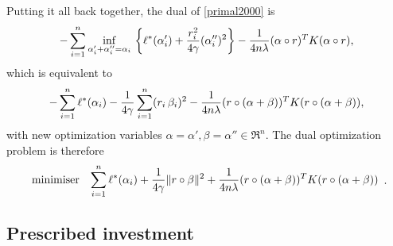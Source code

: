Putting it all back together, the dual of \eqref{primal2000} is
\begin{equation}
  -\sum_{i=1}^n \inf_{\alpha_i'+\alpha_i''=\alpha_i}\,\left\{\ell^*(\alpha_i') + \frac{r_i^2}{4\gamma}(\alpha_i'')^2\right\}  - \frac{1}{4n\lambda} (\alpha \circ r)^TK(\alpha \circ r),
\end{equation}
which is equivalent to
\begin{equation}
  -\sum_{i=1}^n \ell^*(\alpha_i) - \frac{1}{4\gamma}\sum_{i=1}^n (r_i\,\beta_i)^2 - \frac{1}{4n\lambda}(r \circ (\alpha+\beta))^TK(r \circ (\alpha+\beta)),
\end{equation}
with new optimization variables $\alpha=\alpha',\beta=\alpha'' \in \Re^n$. The dual optimization problem is
therefore
\begin{equation}
  \begin{array}{ll}\mbox{minimiser} & \displaystyle{\sum_{i=1}^n\ell^*(\alpha_i) + \frac{1}{4\gamma}\|r\circ\beta\|^2 + \frac{1}{4n\lambda}(r \circ (\alpha+\beta))^TK(r \circ (\alpha+\beta))}\end{array}.
\end{equation}


\subsection{Prescribed investment}
\todo{}











